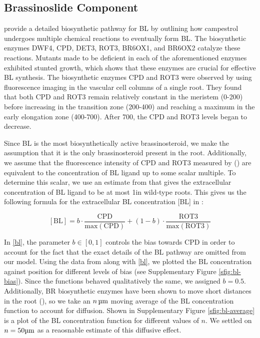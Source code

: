 \subsection{Brassinoslide Component}

\cite{vukasinovic2021} provide a detailed biosynthetic pathway for BL by outlining how campestrol undergoes multiple chemical reactions to eventually form BL. The biosynthetic enzymes DWF4, CPD, DET3, ROT3, BR6OX1, and BR6OX2 catalyze these reactions. Mutants made to be deficient in each of the aforementioned enzymes exhibited stunted growth, which shows that these enzymes are crucial for effective BL synthesis. The biosynthetic enzymes CPD and ROT3 were observed by \cite{vukasinovic2021} using fluorescence imaging in the vascular cell columns of a single root. They found that both CPD and ROT3 remain relatively constant in the meristem (0-200\um) before increasing in the transition zone (200-400\um) and reaching a maximum in the early elongation zone (400-700\um). After 700\um, the CPD and ROT3 levels began to decrease.

\medskip

Since BL is the most biosynthetically active brassinosteroid, we make the assumption that it is the only brassinosteroid present in the root. Additionally, we assume that the fluorescence intensity of CPD and ROT3 measured by (\cite{vukasinovic2021}) are equivalent to the concentration of BL ligand up to some scalar multiple. To determine this scalar, we use an estimate from \cite{vanesse2012} that gives the extracellular concentration of BL ligand to be at most 1\nm in wild-type roots. This gives us the following formula for the extracellular BL concentration [BL] in \nm:

\begin{equation}
    \label{bl}
[\text{BL}] = b \cdot \frac{\text{CPD}}{\text{max}(\text{CPD})} + (1 - b) \cdot \frac{\text{ROT3}}{\text{max}(\text{ROT3})}
\end{equation}

\medskip

In \eqref{bl}, the parameter $b \in [0, 1]$ controls the bias towards CPD in order to account for the fact that the exact details of the BL pathway are omitted from our model. Using the data from \cite{vukasinovic2021} along with \eqref{bl}, we plotted the BL concentration against position for different levels of bias (see Supplementary Figure \ref{sfig:bl-bias}). Since the functions behaved qualitatively the same, we assigned $b = 0.5$. Additionally, BR biosynthetic enzymes have been shown to move short distances in the root (\cite{vukasinovic2021}), so we take an $n\,\um$ moving average of the BL concentration function to account for diffusion. Shown in Supplementary Figure \ref{sfig:bl-average} is a plot of the BL concentration function for different values of $n$. We settled on $n = 50\um$ as a reaosnable estimate of this diffusive effect.

